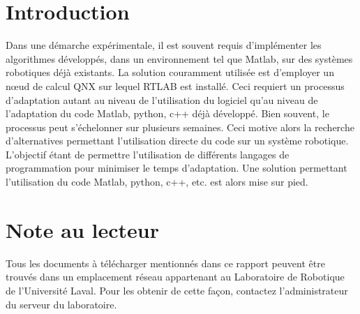\documentclass[root.tex]{subfiles}
\begin{document}
\section{Introduction}
Dans une démarche expérimentale, il est souvent requis d'implémenter les algorithmes développés, dans un environnement tel que Matlab, sur des systèmes robotiques déjà existants. 
La solution couramment utilisée est d'employer un nœud de calcul QNX sur lequel RTLAB est installé. 
Ceci requiert un processus d'adaptation autant au niveau de l'utilisation du logiciel qu'au niveau de l'adaptation du code Matlab, python, c++ déjà développé. 
Bien souvent, le processus peut s'échelonner sur plusieurs semaines. 
Ceci motive alors la recherche d'alternatives permettant l'utilisation directe du code sur un système robotique. 
L'objectif étant de permettre l'utilisation de différents langages de programmation pour minimiser le temps d'adaptation. 
Une solution permettant l'utilisation du code Matlab, python, c++, etc. est alors mise sur pied.


\section{Note au lecteur}
Tous les documents à télécharger mentionnés dans ce rapport peuvent être trouvés dans un emplacement réseau appartenant au Laboratoire de Robotique de l'Université Laval.
Pour les obtenir de cette façon, contactez l'administrateur du serveur du laboratoire.
\end{document}
